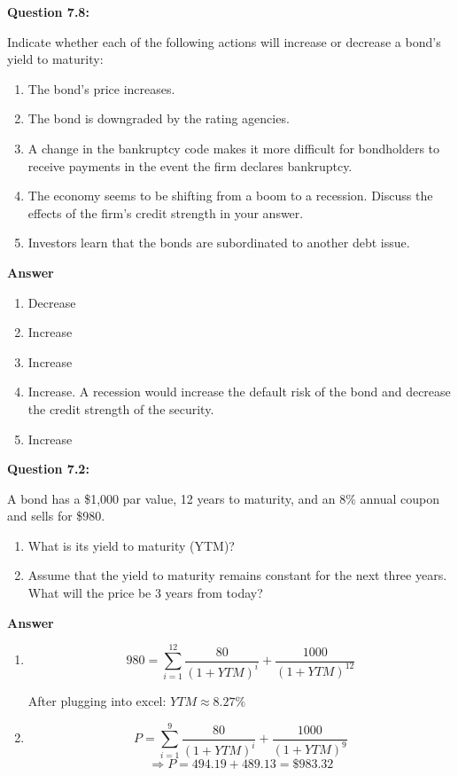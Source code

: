 \documentclass[11pt]{article}
\begin{document}
\textbf{Question 7.8:}
\bigskip

Indicate whether each of the following actions will increase or decrease a bond's yield to maturity:

\begin{enumerate}
  \item[a.] The bond's price increases. 
  \item[b.] The bond is downgraded by the rating agencies. 
  \item[c.] A change in the bankruptcy code makes it more difficult for bondholders to receive payments in the event the firm declares bankruptcy.
  \item[d.] The economy seems to be shifting from a boom to a recession. Discuss the effects of the firm's credit strength in your answer.
  \item[e.] Investors learn that the bonds are subordinated to another debt issue.
\end{enumerate}

\bigskip
\textbf{Answer}

\begin{enumerate}
  \item[a.] Decrease 
  \item[b.] Increase
  \item[c.] Increase 
  \item[d.] Increase. A recession would increase the default risk of the bond and decrease the credit strength of the security. 
  \item[e.] Increase
\end{enumerate}
\bigskip
\bigskip

\textbf{Question 7.2:}
\bigskip

A bond has a \$1,000 par value, 12 years to maturity, and an 8\% annual coupon and sells for \$980. 

\begin{enumerate}
  \item[a.] What is its yield to maturity (YTM)? 
  \item[b.] Assume that the yield to maturity remains constant for the next three years. What will the price be 3 years from today?
\end{enumerate}

\bigskip
\textbf{Answer}

\begin{enumerate}
  \item[a.]
    \[
      980 = \sum_{i=1}^{12} \frac{80}{(1+YTM)^i} + \frac{1000}{(1+YTM)^{12}}
    \]
    \begin{center}
    After plugging into excel: $YTM \approx \boxed{8.27\%}$
    \end{center}

  \item[b.]
    \[
      P = \sum_{i=1}^{9} \frac{80}{(1+YTM)^i} + \frac{1000}{(1+YTM)^{9}}
    \]
    \[
      \Rightarrow P = 494.19 + 489.13 = \boxed{\$983.32}
    \]
\end{enumerate}
\end{document}
